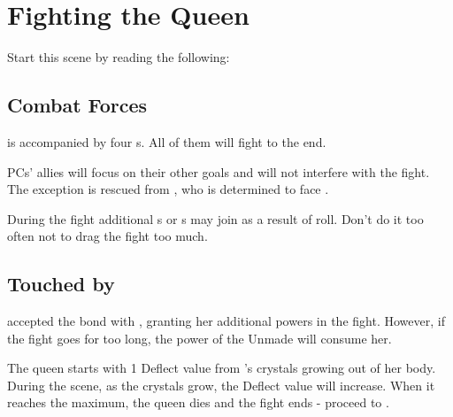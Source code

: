 \section{Fighting the Queen}
\label{sec:queenFight}

Start this scene by reading the following:




\subsection{Combat Forces}

\enemyQueenAesudan{} is accompanied by four \enemyQueensGuard{}s. All of them will fight to the end.

PCs' allies will focus on their other goals and will not interfere with the fight. The exception is \npcCellarBoy{} rescued from , who is determined to face \npcQueen{}.

During the fight additional \enemyQueensGuard{}s or \enemySingerDireform{}s may join as a result of \iconComp{} roll. Don't do it too often not to drag the fight too much.




\subsection{Touched by \npcYeligNarName{}}

\enemyQueenAesudan{} accepted the bond with \npcYeligNar{}, granting her additional powers in the fight. However, if the fight goes for too long, the power of the Unmade will consume her.

The queen starts with 1 Deflect value from \npcYeligNar{}'s crystals growing out of her body. During the scene, as the crystals grow, the Deflect value will increase. When it reaches the maximum, the queen dies and the fight ends - proceed to .




